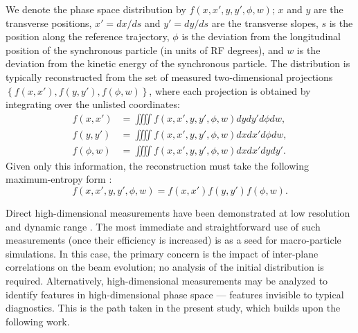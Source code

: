 \documentclass[%
 reprint,
 amsmath,amssymb,
 aps,
prstab,
]{revtex4-2}
\begin{document}
We denote the phase space distribution by $f(x, x', y, y', \phi, w)$; $x$ and $y$ are the transverse positions, $x' = dx / ds$ and $y' = dy / ds$ are the transverse slopes, $s$ is the position along the reference trajectory, $\phi$ is the deviation from the longitudinal position of the synchronous particle (in units of RF degrees), and $w$ is the deviation from the kinetic energy of the synchronous particle. The distribution is typically reconstructed from the set of measured two-dimensional projections $\left\{{f(x, x'), f(y, y'), f(\phi, w)}\right\}$, where each projection is obtained by integrating over the unlisted coordinates:
%
\begin{equation}
    \begin{aligned}
        f(x, x') &= \iiiint
        f(x, x', y, y', \phi, w) {dy}{dy'}{d\phi}{dw}, \\
        f(y, y') &= \iiiint
        f(x, x', y, y', \phi, w) {dx}{dx'}{d\phi}{dw}, \\
        f(\phi, w) &= \iiiint
        f(x, x', y, y', \phi, w) {dx}{dx'}{dy}{dy'}.
    \end{aligned}
\end{equation}
%
Given only this information, the reconstruction must take the following maximum-entropy form \cite{Wong2022-tomography}:
%
\begin{equation}\label{eq:reconstruction}
    f(x, x', y, y', \phi, w) = f(x, x') f(y, y') f(\phi, w). 
\end{equation}
%

Direct high-dimensional measurements have been demonstrated at low resolution and dynamic range \cite{Cathey2018}. The most immediate and straightforward use of such measurements (once their efficiency is increased) is as a seed for macro-particle simulations. In this case, the primary concern is the impact of inter-plane correlations on the beam evolution; no analysis of the initial distribution is required. Alternatively, high-dimensional measurements may be analyzed to identify features in high-dimensional phase space — features invisible to typical diagnostics. This is the path taken in the present study, which builds upon the following work.
\end{document}
